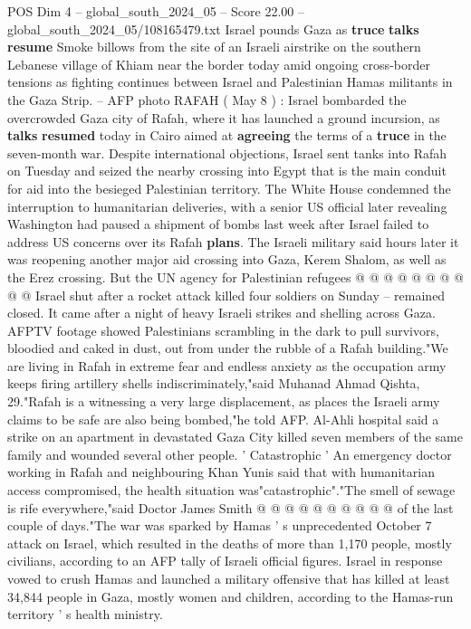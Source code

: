 \begin{textsample}{POS Dim 4 – global\_south\_2024\_05 – Score 22.00 – global\_south\_2024\_05/108165479.txt}  \label{ex:f4_pos_190}
Israel pounds Gaza as \textbf{truce} \textbf{talks} \textbf{resume} Smoke billows from the site of an Israeli airstrike on the southern Lebanese village of Khiam near the border today amid ongoing cross-border tensions as fighting continues between Israel and Palestinian Hamas militants in the Gaza Strip. -- AFP photo RAFAH ( May 8 ) : Israel bombarded the overcrowded Gaza city of Rafah, where it has launched a ground incursion, as \textbf{talks} \textbf{resumed} today in Cairo aimed at \textbf{agreeing} the terms of a \textbf{truce} in the seven-month war.
Despite international objections, Israel sent tanks into Rafah on Tuesday and seized the nearby crossing into Egypt that is the main conduit for aid into the besieged Palestinian territory.
The White House condemned the interruption to humanitarian deliveries, with a senior US official later revealing Washington had paused a shipment of bombs last week after Israel failed to address US concerns over its Rafah \textbf{plans}.
The Israeli military said hours later it was reopening another major aid crossing into Gaza, Kerem Shalom, as well as the Erez crossing.
But the UN agency for Palestinian refugees @ @ @ @ @ @ @ @ @ @ Israel shut after a rocket attack killed four soldiers on Sunday -- remained closed.
It came after a night of heavy Israeli strikes and shelling across Gaza.
AFPTV footage showed Palestinians scrambling in the dark to pull survivors, bloodied and caked in dust, out from under the rubble of a Rafah building."We are living in Rafah in extreme fear and endless anxiety as the occupation army keeps firing artillery shells indiscriminately,"said Muhanad Ahmad Qishta, 29."Rafah is a witnessing a very large displacement, as places the Israeli army claims to be safe are also being bombed,"he told AFP.
Al-Ahli hospital said a strike on an apartment in devastated Gaza City killed seven members of the same family and wounded several other people. ' Catastrophic ' An emergency doctor working in Rafah and neighbouring Khan Yunis said that with humanitarian access compromised, the health situation was"catastrophic"."The smell of sewage is rife everywhere,"said Doctor James Smith @ @ @ @ @ @ @ @ @ @ of the last couple of days."The war was sparked by Hamas ' s unprecedented October 7 attack on Israel, which resulted in the deaths of more than 1,170 people, mostly civilians, according to an AFP tally of Israeli official figures.
Israel in response vowed to crush Hamas and launched a military offensive that has killed at least 34,844 people in Gaza, mostly women and children, according to the Hamas-run territory ' s health ministry.

\end{textsample}

